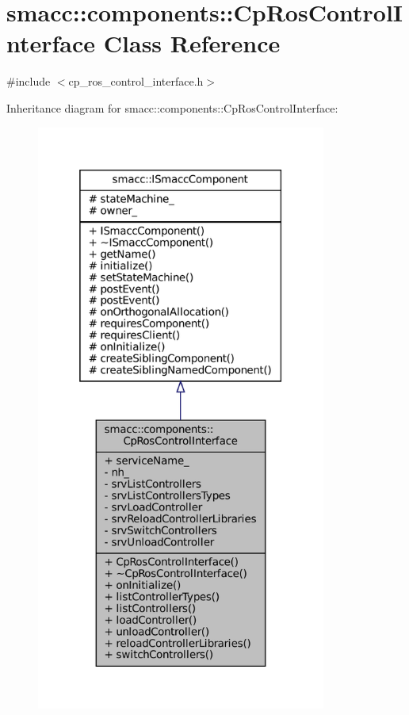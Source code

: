 \hypertarget{classsmacc_1_1components_1_1CpRosControlInterface}{}\section{smacc\+:\+:components\+:\+:Cp\+Ros\+Control\+Interface Class Reference}
\label{classsmacc_1_1components_1_1CpRosControlInterface}


{\ttfamily \#include $<$cp\+\_\+ros\+\_\+control\+\_\+interface.\+h$>$}



Inheritance diagram for smacc\+:\+:components\+:\+:Cp\+Ros\+Control\+Interface\+:
\nopagebreak
\begin{figure}[H]
\begin{center}
\leavevmode
\includegraphics[height=550pt]{classsmacc_1_1components_1_1CpRosControlInterface__inherit__graph}
\end{center}
\end{figure}


